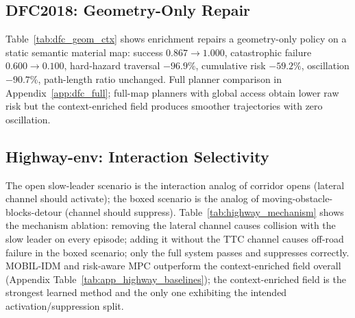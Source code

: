 \subsection{DFC2018: Geometry-Only Repair}
\label{sec:exp_dfc}

Table~\ref{tab:dfc_geom_ctx} shows enrichment repairs a geometry-only
policy on a static semantic material map: success $0.867{\to}1.000$,
catastrophic failure $0.600{\to}0.100$, hard-hazard traversal $-96.9\%$,
cumulative risk $-59.2\%$, oscillation $-90.7\%$, path-length ratio
unchanged.
Full planner comparison in Appendix~\ref{app:dfc_full}; full-map
planners with global access obtain lower raw risk but the context-enriched field produces
smoother trajectories with zero oscillation.

\begin{table}[t]
\centering
\caption{\textbf{DFC2018 outcome shift} (300 paired episodes).}
\label{tab:dfc_geom_ctx}
\scriptsize\setlength{\tabcolsep}{3pt}\renewcommand{\arraystretch}{1.08}
\end{table}

\subsection{Highway-env: Interaction Selectivity}
\label{sec:exp_highway}

The open slow-leader scenario is the interaction analog of corridor
opens (lateral channel should activate); the boxed scenario is the
analog of moving-obstacle-blocks-detour (channel should suppress).
Table~\ref{tab:highway_mechanism} shows the mechanism ablation: removing
the lateral channel causes collision with the slow leader on every
episode; adding it without the TTC channel causes off-road failure in
the boxed scenario; only the full system passes and suppresses correctly.
MOBIL-IDM and risk-aware MPC outperform the context-enriched field overall (Appendix
Table~\ref{tab:app_highway_baselines}); the context-enriched field is the strongest
learned method and the only one exhibiting the intended
activation/suppression split.

